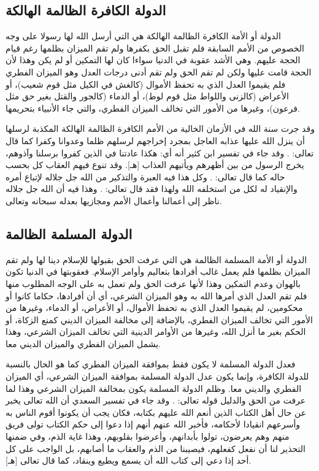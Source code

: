 \subsection{الدولة الكافرة الظالمة الهالكة}

الدولة أو الأمة الكافرة الظالمة الهالكة هي التي أرسل الله لها رسولا على وجه الخصوص من الأمم السابقة فلم تقبل الحق بكفرها ولم تقم الميزان بظلمها رغم قيام الحجة عليهم. وهي الأشد عقوبة في الدنيا سواءا كان لها التمكين أو لم يكن وهذا لأن الحجة قامت عليها ولكن لم تقم الحق ولم تقم أدنى درجات العدل وهو الميزان الفطري فلم يقيموا العدل الذي به تحفظ الأموال (كالغش في الكيل مثل قوم شعيب)، أو الأعراض (كالزنى واللواط مثل قوم لوط)، أو الدماء (كالجور والقتل بغير حق مثل فرعون)، وغيرها من الأمور التي تخالف الميزان الفطري، والتي جاء الأنبياء بتحريمها.

وقد جرت سنة الله في الأزمان الخالية من الأمم الكافرة الظالمة الهالكة المكذبة لرسلها أن ينزل الله عليها عذابه العاجل بمجرد إخراجهم لرسلهم ظلما وعدوانا وكفرا كما قال تعالى:  
\quranayah*[17][77]{\footnotesize \surahname*[17]}. وقد جاء في تفسير ابن كثير أنه أي: هكذا عادتنا في الذين كفروا برسلنا وآذوهم، يخرج الرسول من بين أظهرهم ويأتيهم العذاب [هـ]. وقد تنوع فيهم العقاب كل بحسب حاله كما قال تعالى: 
\quranayah*[29][40]{\footnotesize \surahname*[29]}. وكل هذا فيه العبرة والتذكير من الله جل جلاله لإتباع أمره والإنقياد له لكل من استخلفه الله ولهذا فقد قال تعالى:
\quranayah*[10][13-14]{\footnotesize \surahname*[10]}.
وهذا فيه أن الله جل جلاله ناظر إلى أعمالنا وأعمال الأمم ومجازيها بعدله سبحانه وتعالى.

\subsection{الدولة المسلمة الظالمة}

الدولة أو الأمة المسلمة الظالمة هي التي عرفت الحق بقبولها للإسلام دينا لها ولم تقم الميزان بظلمها فلم يعمل غالب أفرادها بتعاليم وأوامر الإسلام. فعقوبتها في الدنيا تكون بالهوان وعدم التمكين وهذا لأنها عرفت الحق ولم تعمل به على الوجه المطلوب منها فلم تقم العدل الذي أمرها الله به وهو الميزان الشرعي، أي أن أفرادها، حكاما كانوا أو محكومين، لم يقيموا العدل الذي به تحفظ الأموال، أو الأعراض، أو الدماء، وغيرها من الأمور التي تخالف الميزان الفطري، بالإضافة إلى مخالفة الميزان الديني كمنع الزكاة، أو الحكم بغير ما أنزل الله، وغيرها من الأوامر الدينية التي تخالف الميزان الشرعي، وهذا يشمل الميزان الفطري والميزان الديني معا.

فعدل الدولة المسلمة لا يكون فقط بموافقة الميزان الفطري كما هو الحال بالنسبة للدولة الكافرة، وإنما يكون عدل الدولة المسلمة بموافقة الميزان الشرعي، أي الميزان الفطري والديني معا. وظلم الدولة المسلمة يكون بمخالفة الميزان الشرعي وهذا لما عرفت من الحق والدليل قوله تعالى: 
\quranayah*[3][23]{\footnotesize \surahname*[3]}. وقد جاء في تفسير السعدي أن الله تعالى يخبر عن حال أهل الكتاب الذين أنعم الله عليهم بكتابه، فكان يجب أن يكونوا أقوم الناس به وأسرعهم انقيادا لأحكامه، فأخبر الله عنهم أنهم إذا دعوا إلى حكم الكتاب تولى فريق منهم وهم يعرضون، تولوا بأبدانهم، وأعرضوا بقلوبهم، وهذا غاية الذم، وفي ضمنها التحذير لنا أن نفعل كفعلهم، فيصيبنا من الذم والعقاب ما أصابهم، بل الواجب على كل أحد إذا دعي إلى كتاب الله أن يسمع ويطيع وينقاد، كما قال تعالى \quranayah*[24][51]{\footnotesize \surahname*[24]} [هـ].

